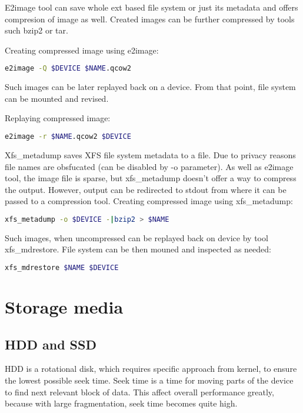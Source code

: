 \documentclass[
  color, %
  table, %
  lof,   %
  lot,   %
]{fithesis3}
\begin{document}
E2image tool can save whole ext based file system or just its metadata and offers compresion of image as well. Created images can be further compressed by tools such bzip2 or tar.

\noindent Creating compressed image using e2image:
\begin{lstlisting}[language=bash]
  e2image -Q $DEVICE $NAME.qcow2
\end{lstlisting}

\noindent Such images can be later replayed back on a device. From that point, file system can be mounted and revised.

\noindent Replaying compressed image:
\begin{lstlisting}[language=bash]
  e2image -r $NAME.qcow2 $DEVICE
\end{lstlisting}

Xfs\_metadump saves XFS file system metadata to a file. Due to privacy reasons file names are obsfucated (can be disabled by -o parameter). As well as e2image tool, the image file is sparse, but xfs\_metadump doesn't offer a way to compress the output. However, output can be redirected to stdout from where it can be passed to a compression tool. Creating compressed image using xfs\_metadump:

\begin{lstlisting}[language=bash]
  xfs_metadump -o $DEVICE -|bzip2 > $NAME
\end{lstlisting}

Such images, when uncompressed can be replayed back on device by tool xfs\_mdrestore. File system can be then mouned and inspected as needed:

\begin{lstlisting}[language=bash]
  xfs_mdrestore $NAME $DEVICE
\end{lstlisting}

\chapter{Storage media}
\section{HDD and SSD}
HDD is a rotational disk, which requires specific approach from kernel, to ensure the lowest possible seek time. Seek time is a time for moving parts of the device to find next relevant block of data. This affect overall performance greatly, because with large fragmentation, seek time becomes quite high.
\end{document}
